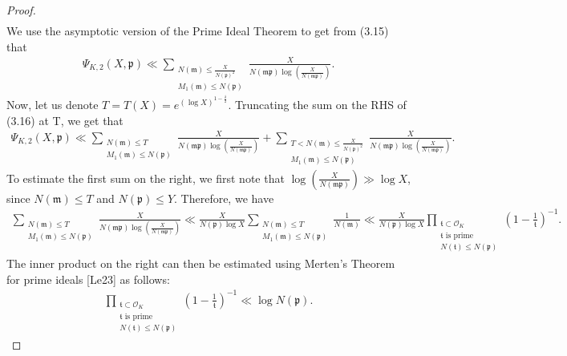 \documentclass[12pt]{article}
\numberwithin{equation}{section}
\numberwithin{equation}{section}
\begin{document}
\begin{proof}
\begin{align}
    \end{align}
    We use the asymptotic version of the Prime Ideal Theorem to get from (3.15) that
    \begin{align}
          \Psi_{K,2}(X,\mathfrak{p}) \ll \sum_{\substack{N(\mathfrak{m}) \leq \frac{X}{N(\mathfrak{p})^2} \\ M_1(\mathfrak{m})\leq N(\mathfrak{p})}} \frac{X}{N(\mathfrak{mp})\log \left(\frac{X}{N(\mathfrak{mp})}\right)}.
    \end{align}
    Now, let us denote $T=T(X)=e^{(\log X)^{1-\frac{\delta}{2}}}$. Truncating the sum on the RHS of (3.16) at T, we get that
\begin{align}
    \Psi_{K,2}(X,\mathfrak{p}) \ll \sum_{\substack{N(\mathfrak{m}) \leq T \\ M_1(\mathfrak{m})\leq N(\mathfrak{p})}} \frac{X}{N(\mathfrak{mp})\log \left(\frac{X}{N(\mathfrak{mp})}\right)} +  \sum_{\substack{T<N(\mathfrak{m}) \leq \frac{X}{N(\mathfrak{p})^2} \\ M_1(\mathfrak{m})\leq N(\mathfrak{p})}} \frac{X}{N(\mathfrak{mp})\log \left(\frac{X}{N(\mathfrak{mp})}\right)} .
\end{align}
To estimate the first sum on the right, we first note that $\log\left(\frac{X}{N(\mathfrak{mp})}\right) \gg \log X$, since $N(\mathfrak{m})\leq T$ and $N(\mathfrak{p})\leq Y$. Therefore, we have 
\begin{align}
    \sum_{\substack{N(\mathfrak{m}) \leq T \\ M_1(\mathfrak{m})\leq N(\mathfrak{p})}} \frac{X}{N(\mathfrak{mp})\log \left(\frac{X}{N(\mathfrak{mp})}\right)} \ll \frac{X}{N(\mathfrak{p})\log X} \sum_{\substack{N(\mathfrak{m}) \leq T \\ M_1(\mathfrak{m})\leq N(\mathfrak{p})}} \frac{1}{N(\mathfrak{m})} \ll \frac{X}{N(\mathfrak{p})\log X} \prod_{\substack{\mathfrak{t} \subset \mathcal{O}_K\\ \mathfrak{t}\text{ is prime} \\ N(\mathfrak{t}) \leq N(\mathfrak{p})}}\left(1-\frac{1}{\mathfrak{t}}\right)^{-1}.
\end{align}
The inner product on the right can then be estimated using Merten's Theorem for prime ideals [Le23] as follows:
\begin{align}
    \prod_{\substack{\mathfrak{t} \subset \mathcal{O}_K\\ \mathfrak{t}\text{ is prime} \\ N(\mathfrak{t}) \leq N(\mathfrak{p})}}\left(1-\frac{1}{\mathfrak{t}}\right)^{-1}  \ll \log N(\mathfrak{p}).

\end{align}
\end{proof}
\end{document}
